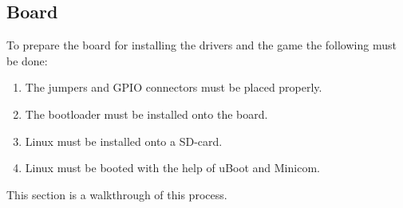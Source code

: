 \subsection{Board}

To prepare the board for installing the drivers and the game the following must be done:
\begin{enumerate}
  \item The jumpers and GPIO connectors must be placed properly.
  \item The bootloader must be installed onto the board.
  \item Linux must be installed onto a SD-card.
  \item Linux must be booted with the help of uBoot and Minicom.
\end{enumerate}

This section is a walkthrough of this process.
